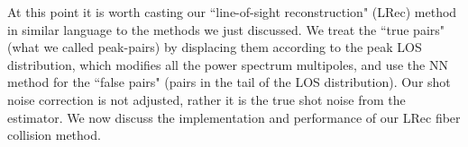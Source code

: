                                                                                                                                                                                                                                                                          At this point it is worth casting our ``line-of-sight reconstruction" (LRec) 
                                                                                                                                                                                                                                                                         method in similar language to the methods we just discussed. We treat the 
                                                                                                                                                                                                                                                                         ``true pairs" (what we called peak-pairs) by displacing them according to 
                                                                                                                                                                                                                                                                         the peak LOS distribution, which modifies all the power spectrum multipoles, 
                                                                                                                                                                                                                                                                         and use the NN method for the ``false pairs" (pairs in the tail of the LOS 
                                                                                                                                                                                                                                                                         distribution). Our shot noise correction is not adjusted, rather it is the 
                                                                                                                                                                                                                                                                         true shot noise from the estimator. 
                                                                                                                                                                                                                                                                         We now discuss the implementation and performance of our  LRec fiber collision method. 


